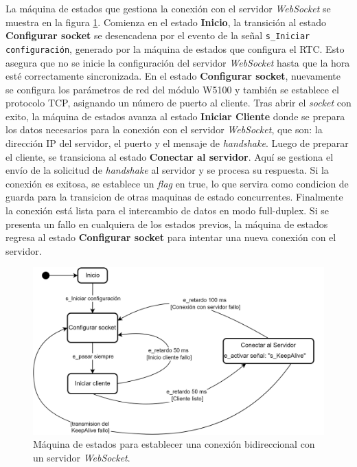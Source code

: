 
La máquina de estados que gestiona la conexión con el servidor \textit{WebSocket} se muestra en la figura \ref{fig:sc_connectionWebSocket}. Comienza en el estado \textbf{Inicio}, la transición al estado \textbf{Configurar socket} se desencadena por el evento de la señal \texttt{s\_Iniciar configuración}, generado por la máquina de estados que configura el RTC. Esto asegura que no se inicie la configuración del servidor \textit{WebSocket} hasta que la hora esté correctamente sincronizada. En el estado \textbf{Configurar socket}, nuevamente se configura  los parámetros de red del módulo W5100 y también se establece el protocolo TCP, asignando un número de puerto al cliente. Tras abrir el \textit{socket} con exito, la máquina de estados avanza al estado \textbf{Iniciar Cliente} donde se prepara los datos necesarios para la conexión con el servidor \textit{WebSocket}, que son: la dirección IP del servidor, el puerto y el mensaje de \textit{handshake}. Luego de preparar el cliente, se transiciona al estado \textbf{Conectar al servidor}. Aquí se gestiona el envío de la solicitud de \textit{handshake} al servidor y se procesa su respuesta. Si la conexión es exitosa, se establece un \textit{flag} en true, lo que servira como condicion de guarda para la transicion de otras maquinas de estado concurrentes. Finalmente la conexión está lista para el intercambio de datos en modo full-duplex. Si se presenta un fallo en cualquiera de los estados previos, la máquina de estados regresa al estado \textbf{Configurar socket} para intentar una nueva conexión con el servidor.

\begin{figure}[H]
    \centering
    \includegraphics[width=0.8\linewidth]{Figuras/datalogger/Firmware/sc_connectionWebSocket.png}
    \caption{Máquina de estados para establecer una conexión bidireccional con un servidor \textit{WebSocket}.}
    \label{fig:sc_connectionWebSocket}
\end{figure}

